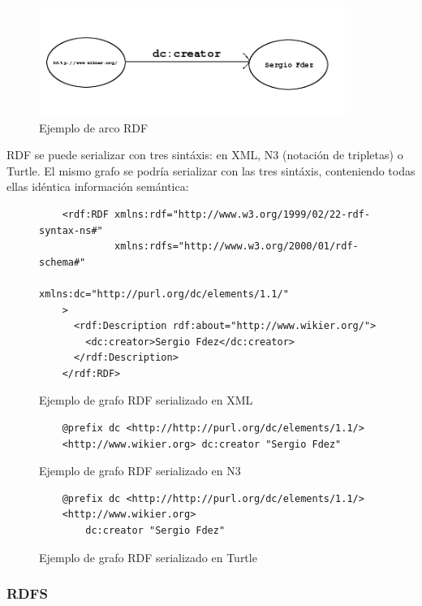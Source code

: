 \begin{figure}[ht]
	\centering
	\includegraphics[width=10cm]{images/arc-example.png}
	\caption{Ejemplo de arco RDF}
	\label{fig:rdfTripletExample}
\end{figure}


RDF se puede serializar con tres sintáxis: en XML, N3 (notación de tripletas)
o Turtle. El mismo grafo se podría serializar con las tres sintáxis, conteniendo 
todas ellas idéntica información semántica:

\begin{figure}[tp]
\begin{verbatim}
	<rdf:RDF xmlns:rdf="http://www.w3.org/1999/02/22-rdf-syntax-ns#"
	         xmlns:rdfs="http://www.w3.org/2000/01/rdf-schema#"
                 xmlns:dc="http://purl.org/dc/elements/1.1/"
	>
	  <rdf:Description rdf:about="http://www.wikier.org/">
	    <dc:creator>Sergio Fdez</dc:creator>	
	  </rdf:Description>
	</rdf:RDF>
\end{verbatim}
	\caption{Ejemplo de grafo RDF serializado en XML}
	\label{fig:ejemplo.rdfxml}
\end{figure}

\begin{figure}[tp]
\begin{verbatim}
	@prefix dc <http://http://purl.org/dc/elements/1.1/>
	<http://www.wikier.org> dc:creator "Sergio Fdez"
\end{verbatim}
	\caption{Ejemplo de grafo RDF serializado en N3}
	\label{fig:ejemplo.rdfn3}
\end{figure}

\begin{figure}[tp]
\begin{verbatim}
	@prefix dc <http://http://purl.org/dc/elements/1.1/>
	<http://www.wikier.org> 
		dc:creator "Sergio Fdez"
\end{verbatim}
	\caption{Ejemplo de grafo RDF serializado en Turtle}
	\label{fig:ejemplo.rdfturtle}
\end{figure}

\subsubsection{RDFS}

